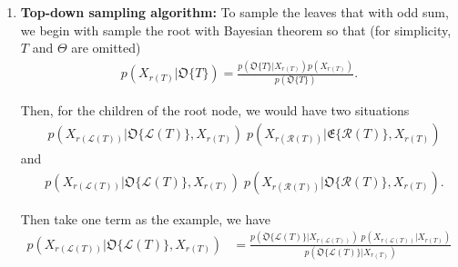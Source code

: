 \documentclass[11pt]{extarticle}
\newcommand{\0}{\mathbf{0}}
\renewcommand{\(}{\left(}
\renewcommand{\)}{\right)}
\theoremstyle{definition}
\begin{document}
\begin{enumerate}
\item \textbf{Top-down sampling algorithm:} To sample the leaves that with odd sum, we begin with sample the root with Bayesian theorem so that (for simplicity, $T$ and $\Theta$ are omitted)
\begin{align*}
	p(X_{r(T)} \vert \mathfrak{O}\{T\}) = \frac{p(\mathfrak{O}\{T\} \vert X_{r(T)}) p(X_{r(T)})}{p(\mathfrak{O}\{T\})}.
\end{align*}
\par Then, for the children of the root node, we would have two situations
\begin{align*}
	 & p(X_{r(\mathcal{L}(T))} \vert \mathfrak{O}\{\mathcal{L}(T)\}, X_{r(T)}) \; p(X_{r(\mathcal{R}(T))} \vert \mathfrak{E}\{\mathcal{R}(T)\}, X_{r(T)})
\end{align*}
and
\begin{align*}
	 & p(X_{r(\mathcal{L}(T))} \vert \mathfrak{O}\{\mathcal{L}(T)\}, X_{r(T)}) \; p(X_{r(\mathcal{R}(T))} \vert \mathfrak{O}\{\mathcal{R}(T)\}, X_{r(T)}).
\end{align*}
\par Then take one term as the example, we have
\begin{align*}
	p(X_{r(\mathcal{L}(T))} \vert \mathfrak{O}\{\mathcal{L}(T)\}, X_{r(T)}) & = \frac{p(\mathfrak{O}\{\mathcal{L}(T)\} \vert X_{r(\mathcal{L}(T))}) \; p(X_{r(\mathcal{L}(T))} \vert X_{r(T)})}{p(\mathfrak{O}\{\mathcal{L}(T)\} \vert X_{r(T)})}
\end{align*}
\end{enumerate}

\noindent{} \\


\noindent{} \\

\noindent{} \\
\end{document}
